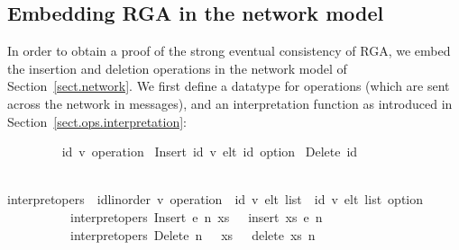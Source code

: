 \subsection{Embedding RGA in the network model}

In order to obtain a proof of the strong eventual consistency of RGA, we embed the insertion and deletion operations in the network model of Section~\ref{sect.network}.
We first define a datatype for operations (which are sent across the network in messages), and an interpretation function as introduced in Section~\ref{sect.ops.interpretation}:
\vspace{0.35em}
\begin{isabellebody}
\ \ \ \ \ \ \ \  {\isacharparenleft}{\isacharprime}id{\isacharcomma}\ {\isacharprime}v{\isacharparenright}\ operation\ {\isacharequal} Insert\ {\isachardoublequoteopen}{\isacharparenleft}{\isacharprime}id{\isacharcomma}\ {\isacharprime}v{\isacharparenright}\ elt{\isachardoublequoteclose}\ {\isachardoublequoteopen}{\isacharprime}id\ option{\isachardoublequoteclose}\ {\isacharbar} Delete\ {\isachardoublequoteopen}{\isacharprime}id{\isachardoublequoteclose}
\end{isabellebody}
\vspace{0.35em}
\begin{isabellebody}
\ \ \ \ \ \ \ \  interpret{\isacharunderscore}opers\ {\isacharcolon}{\isacharcolon}\ {\isachardoublequoteopen}{\isacharparenleft}{\isacharprime}id{\isacharcolon}{\isacharcolon}linorder{\isacharcomma}\ {\isacharprime}v{\isacharparenright}\ operation\ {\isasymRightarrow}\ {\isacharparenleft}{\isacharprime}id{\isacharcomma}\ {\isacharprime}v{\isacharparenright}\ elt\ list\ {\isasymRightarrow}\ {\isacharparenleft}{\isacharprime}id{\isacharcomma}\ {\isacharprime}v{\isacharparenright}\ elt\ list\ option{\isachardoublequoteclose}\ \isanewline
\ \ \ \ \ \ \ \ \ \ {\isachardoublequoteopen}interpret{\isacharunderscore}opers\ {\isacharparenleft}Insert\ e\ n{\isacharparenright}\ xs\ \ {\isacharequal}\ insert\ xs\ e\ n{\isachardoublequoteclose}\ {\isacharbar}\isanewline
\ \ \ \ \ \ \ \ \ \ {\isachardoublequoteopen}interpret{\isacharunderscore}opers\ {\isacharparenleft}Delete\ n{\isacharparenright}\ \ \ xs\ \ {\isacharequal}\ delete\ xs\ n{\isachardoublequoteclose}
\end{isabellebody}
\vspace{0.35em}

